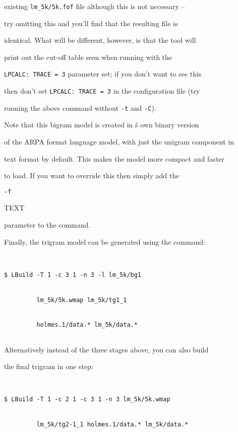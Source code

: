 existing {\tt lm\_5k/5k.fof} file although this is not necessary --


try omitting this and you'll find that the resulting file is


identical.  What will be different, however, is that the tool will


print out the cut-off table seen when running  with the


{\tt LPCALC: TRACE = 3} parameter set; if you don't want to see this


then don't set {\tt LPCALC: TRACE = 3} in the configuration file (try


running the above command without {\tt -t} and {\tt -C}).





Note that this bigram model is created in \HTK\'s own binary version


of the ARPA format language model, with just the unigram component in


text format by default.  This makes the model more compact and faster


to load.  If you want to override this then simply add the {\tt -f


TEXT} parameter to the command.





Finally, the trigram model can be generated using the command:


\begin{verbatim}


$ LBuild -T 1 -c 3 1 -n 3 -l lm_5k/bg1


         lm_5k/5k.wmap lm_5k/tg1_1  


         holmes.1/data.* lm_5k/data.*


\end{verbatim} %





Alternatively instead of the three stages above, you can also build


the final trigram in one step:


\begin{verbatim}


$ LBuild -T 1 -c 2 1 -c 3 1 -n 3 lm_5k/5k.wmap


         lm_5k/tg2-1_1 holmes.1/data.* lm_5k/data.*


\end{verbatim} %


